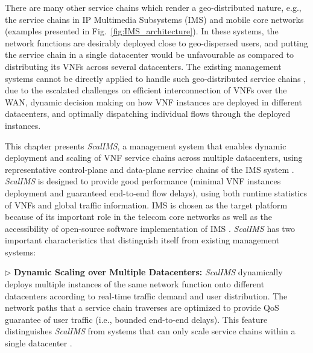   There are many other service chains which render a geo-distributed nature, e.g., the service chains in IP Multimedia Subsystems (IMS) \cite{3gpp-ims} and mobile core networks~\cite{epc} (examples presented in Fig.~\ref{fig:IMS_architecture}). In these systems, the network functions are desirably deployed close to geo-dispersed users, %
 and putting the service chain in a single datacenter would be unfavourable as compared to distributing its VNFs across several datacenters. %
 The existing management systems cannot be directly applied to handle such geo-distributed service chains \cite{qazi2016klein}, due to the escalated challenges on efficient interconnection of VNFs over the WAN, dynamic decision making on how VNF instances are deployed in different datacenters, and optimally dispatching individual flows through the deployed instances.




This chapter presents \textit{ScalIMS}, a management system that enables dynamic deployment and scaling of VNF service chains across multiple datacenters, using representative control-plane and data-plane service chains of the IMS system \cite{3gpp-ims}. \textit{ScalIMS} is designed to provide good performance (minimal VNF instances deployment and guaranteed end-to-end flow delays), using both runtime statistics of VNFs and global traffic information. IMS is chosen as the target platform because of its important role in the telecom core networks as well as the accessibility of open-source software implementation of IMS \cite{project-clearwater}. \textit{ScalIMS} has two important characteristics that distinguish itself from existing management systems:

$\triangleright$ \textbf{Dynamic Scaling over Multiple Datacenters:} \textit{ScalIMS} dynamically deploys multiple instances of the same network function onto different datacenters according to real-time traffic demand and user distribution. The network paths that a service chain traverses are optimized to provide QoS guarantee of user traffic (i.e., bounded end-to-end delays). This feature distinguishes \textit{ScalIMS} from systems that can only scale service chains within a single datacenter \cite{palkar2015e2, gember2012stratos}.

